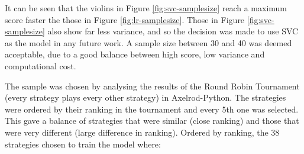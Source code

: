 It can be seen that the violins in Figure \ref{fig:svc-samplesize} reach a maximum score faster the those in Figure \ref{fig:lr-samplesize}.
Those in Figure \ref{fig:svc-samplesize} also show far less variance, and so the decision was made to use SVC as the model in any future work.
A sample size between 30 and 40 was deemed acceptable, due to a good balance between high score, low variance and computational cost.

The sample was chosen by analysing the results of the Round Robin Tournament (every strategy plays every other strategy) in Axelrod-Python.
The strategies were ordered by their ranking in the tournament and every 5th one was selected.
This gave a balance of strategies that were similar (close ranking) and those that were very different (large difference in ranking).
Ordered by ranking, the 38 strategies chosen to train the model where:

